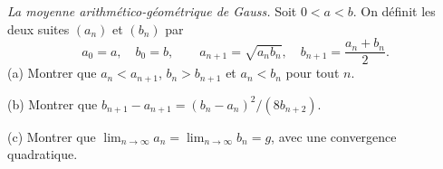 \emph{La moyenne arithmético-géométrique de Gauss.} Soit $0 < a < b$. On définit les deux suites $(a_n)$ et $(b_n)$ par
\[ a_0 = a,\quad b_0 = b,\qquad a_{n+1} = \sqrt{a_n b_n},\quad b_{n+1} = \frac{a_n + b_n}{2}. \]
(a) Montrer que $a_n < a_{n+1}$, $b_n > b_{n+1}$ et $a_n < b_n$ pour tout $n$.

(b) Montrer que $b_{n+1} - a_{n+1} = (b_n - a_n)^2/(8b_{n+2})$.

(c) Montrer que $\lim_{n\to\infty} a_n = \lim_{n\to\infty} b_n = g$, avec une convergence quadratique.
